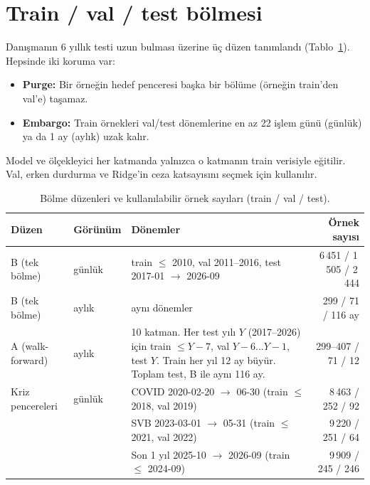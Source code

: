 \documentclass[11pt,a4paper]{article}
\begin{document}
\section{Train / val / test bölmesi}
Danışmanın 6 yıllık testi uzun bulması üzerine üç düzen tanımlandı (Tablo~\ref{tab:splits}). Hepsinde iki koruma var:
\begin{itemize}
  \item \textbf{Purge:} Bir örneğin hedef penceresi başka bir bölüme (örneğin train'den val'e) taşamaz.
  \item \textbf{Embargo:} Train örnekleri val/test dönemlerine en az 22 işlem günü (günlük) ya da 1 ay (aylık) uzak kalır.
\end{itemize}
Model ve ölçekleyici her katmanda yalnızca o katmanın train verisiyle eğitilir. Val, erken durdurma ve Ridge'in ceza
katsayısını seçmek için kullanılır.

\begin{table}[h]
\centering\small
\caption{Bölme düzenleri ve kullanılabilir örnek sayıları (train / val / test).}
\label{tab:splits}
\begin{tabular}{@{}llp{6.6cm}r@{}}
\toprule
\textbf{Düzen} & \textbf{Görünüm} & \textbf{Dönemler} & \textbf{Örnek sayısı} \\
\midrule
B (tek bölme) & günlük & train $\le$ 2010, val 2011--2016, test 2017-01 $\to$ 2026-09 & 6\,451 / 1\,505 / 2\,444 \\
B (tek bölme) & aylık  & aynı dönemler & 299 / 71 / 116 ay \\
A (walk-forward) & aylık & 10 katman. Her test yılı $Y$ (2017--2026) için train $\le Y{-}7$, val $Y{-}6 \ldots Y{-}1$,
                         test $Y$. Train her yıl 12 ay büyür. Toplam test, B ile aynı 116 ay. & 299--407 / 71 / 12 \\
Kriz pencereleri & günlük & COVID 2020-02-20 $\to$ 06-30 (train $\le$ 2018, val 2019) & 8\,463 / 252 / 92 \\
                 &        & SVB 2023-03-01 $\to$ 05-31 (train $\le$ 2021, val 2022) & 9\,220 / 251 / 64 \\
                 &        & Son 1 yıl 2025-10 $\to$ 2026-09 (train $\le$ 2024-09) & 9\,909 / 245 / 246 \\
\bottomrule
\end{tabular}
\end{table}

\end{document}
